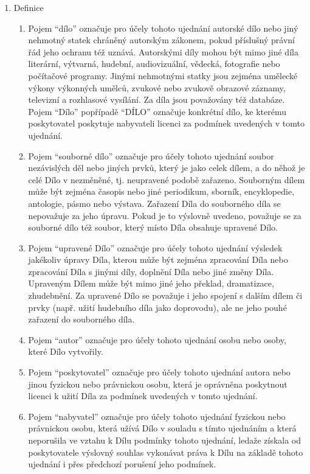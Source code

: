 \begin{enumerate}
  \item Definice
    \begin{enumerate}
      \item Pojem ``dílo'' označuje pro účely tohoto ujednání autorské dílo nebo jiný nehmotný statek chráněný autorským zákonem, pokud příslušný právní řád jeho ochranu též uznává. Autorskými díly mohou být mimo jiné díla literární, výtvarná, hudební, audiovizuální, vědecká, fotografie nebo počítačové programy. Jinými nehmotnými statky jsou zejména umělecké výkony výkonných umělců, zvukové nebo zvukově obrazové záznamy, televizní a rozhlasové vysílání. Za díla jsou považovány též databáze. Pojem ``Dílo'' popřípadě ``DÍLO'' označuje konkrétní dílo, ke kterému poskytovatel poskytuje nabyvateli licenci za podmínek uvedených v tomto ujednání.
      \item Pojem ``souborné dílo'' označuje pro účely tohoto ujednání soubor nezávislých děl nebo jiných prvků, který je jako celek dílem, a do něhož je celé Dílo v nezměněné, tj. neupravené podobě zařazeno. Souborným dílem může být zejména časopis nebo jiné periodikum, sborník, encyklopedie, antologie, pásmo nebo výstava. Zařazení Díla do souborného díla se nepovažuje za jeho úpravu. Pokud je to výslovně uvedeno, považuje se za souborné dílo též soubor, který místo Díla obsahuje upravené Dílo.
      \item Pojem ``upravené Dílo'' označuje pro účely tohoto ujednání výsledek jakékoliv úpravy Díla, kterou může být zejména zpracování Díla nebo zpracování Díla s jinými díly, doplnění Díla nebo jiné změny Díla. Upraveným Dílem může být mimo jiné jeho překlad, dramatizace, zhudebnění. Za upravené Dílo se považuje i jeho spojení s dalším dílem či prvky (např. užití hudebního díla jako doprovodu), ale ne jeho pouhé zařazení do souborného díla.
      \item Pojem ``autor'' označuje pro účely tohoto ujednání osobu nebo osoby, které Dílo vytvořily.
      \item Pojem ``poskytovatel'' označuje pro účely tohoto ujednání autora nebo jinou fyzickou nebo právnickou osobu, která je oprávněna poskytnout licenci k užití Díla za podmínek uvedených v tomto ujednání.
      \item Pojem ``nabyvatel'' označuje pro účely tohoto ujednání fyzickou nebo právnickou osobu, která užívá Dílo v souladu s tímto ujednáním a která neporušila ve vztahu k Dílu podmínky tohoto ujednání, ledaže získala od poskytovatele výslovný souhlas vykonávat práva k Dílu na základě tohoto ujednání i přes předchozí porušení jeho podmínek.

\end{enumerate}
\end{enumerate}
